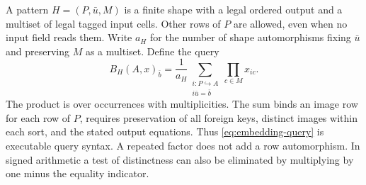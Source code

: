 \documentclass[11pt,a4paper]{article}
\theoremstyle{definition}
\theoremstyle{remark}\newaliascnt{remark}{theorem}
\numberwithin{equation}{section}
\begin{document}
A pattern $H=(P,\bar u,M)$ is a finite shape with a legal ordered output and a multiset of legal tagged input cells. Other rows of $P$ are allowed, even when no input field reads them. Write $a_H$ for the number of shape automorphisms fixing $\bar u$ and preserving $M$ as a multiset. Define the query
\begin{equation}\label{eq:embedding-query}
 B_H(A,x)_{\bar b}=\frac{1}{a_H}
 \sum_{\substack{i:P\hookrightarrow A\\i\bar u=\bar b}}\prod_{c\in M}x_{i c}.
\end{equation}
The product is over occurrences with multiplicities. The sum binds an image row for each row of $P$, requires preservation of all foreign keys, distinct images within each sort, and the stated output equations. Thus \eqref{eq:embedding-query} is executable query syntax. A repeated factor does not add a row automorphism. In signed arithmetic a test of distinctness can also be eliminated by multiplying by one minus the equality indicator.
\end{document}
